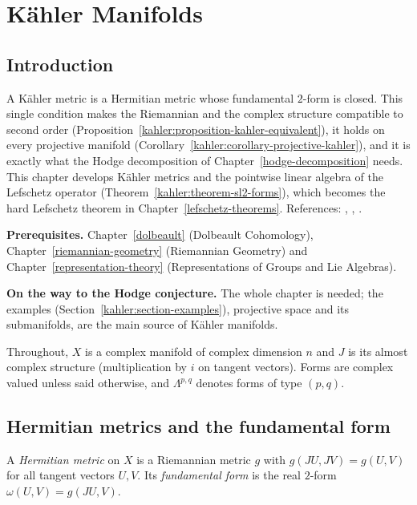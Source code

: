 \chapter{K\"ahler Manifolds}\label{kahler}

\section{Introduction}\label{kahler:section-introduction}

A K\"ahler metric is a Hermitian metric whose fundamental $2$-form is closed. This single condition makes the Riemannian and the complex
structure compatible to second order (Proposition~\ref{kahler:proposition-kahler-equivalent}), it holds on every projective manifold
(Corollary~\ref{kahler:corollary-projective-kahler}), and it is exactly what the Hodge decomposition of Chapter~\ref{hodge-decomposition}
needs. This chapter develops K\"ahler metrics and the pointwise linear algebra of the Lefschetz operator
(Theorem~\ref{kahler:theorem-sl2-forms}), which becomes the hard Lefschetz theorem in Chapter~\ref{lefschetz-theorems}. References:
\cite[Chapter 0]{griffiths-harris}, \cite[Chapters 1 and 3]{huybrechts-complex}, \cite[Chapters 3 and 6]{voisin-hodge-1}.

\noindent\textbf{Prerequisites.} Chapter~\ref{dolbeault} (Dolbeault Cohomology), Chapter~\ref{riemannian-geometry} (Riemannian
Geometry) and Chapter~\ref{representation-theory} (Representations of Groups and Lie Algebras).

\noindent\textbf{On the way to the Hodge conjecture.} The whole chapter is needed; the examples (Section~\ref{kahler:section-examples}), projective space and its submanifolds, are the main source of K\"ahler manifolds.

Throughout, $X$ is a complex manifold of complex dimension $n$ and $J$ is its almost complex structure (multiplication by $i$ on tangent
vectors). Forms are complex valued unless said otherwise, and $\Lambda^{p,q}$ denotes forms of type $(p,q)$.

\section{Hermitian metrics and the fundamental form}\label{kahler:section-hermitian}

\begin{definition}\label{kahler:definition-hermitian}
A \emph{Hermitian metric} on $X$ is a Riemannian metric $g$ with $g(JU, JV) = g(U, V)$ for all tangent vectors $U, V$. Its
\emph{fundamental form} is the real $2$-form $\omega(U, V) = g(JU, V)$.
\end{definition}

